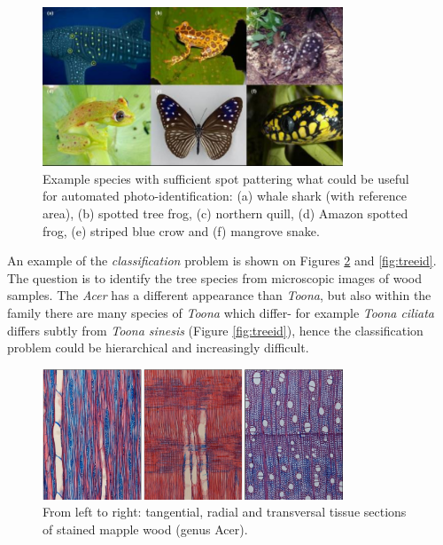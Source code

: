 \begin{figure}[H]
\begin{center}
\includegraphics[width=0.8\textwidth]{fig/photoid}
\end{center}
\caption{Example species with sufficient spot pattering what could be useful for automated photo-identification: (a) whale shark (with reference area),
(b) spotted  tree frog, (c) northern quill, (d) Amazon spotted frog, (e) striped blue crow and (f) mangrove snake.}
\label{fig:photoid}
\end{figure}

An example of the {\em classification} problem is shown on Figures \ref{fig:woodphotoid} and \ref{fig:treeid}. The question is to identify the tree species from microscopic images of wood samples. The {\em Acer} has a different appearance than {\em Toona}, but also within the family there are many species of {\em Toona} which differ- for example {\em Toona ciliata} differs subtly from {\em Toona sinesis} (Figure \ref{fig:treeid}), hence the classification problem could be hierarchical and increasingly difficult.

\begin{figure}[H]
\begin{center}
\includegraphics[width=0.8\textwidth]{fig/woodphotoid}
\end{center}
\caption{From left to right: tangential, radial and transversal tissue sections of stained mapple wood  (genus Acer).}
\label{fig:woodphotoid}
\end{figure}

